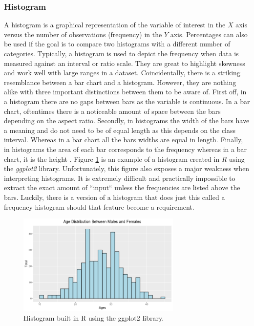 \subsubsection{Histogram}
A histogram is a graphical representation of the variable of interest in the 
$X$ axis versus the number of observations (frequency) in the $Y$ axis. Percentages 
can also be used if the goal is to compare two histograms with a different number of 
categories. Typically, a histogram is used to depict the frequency when data is 
measured against an interval or ratio scale. They are great to highlight skewness
and work well with large ranges in a dataset. Coincidentally, there is a striking
resemblance between a bar chart and a histogram. However, they are nothing alike 
with three important distinctions between them to be aware of. First off, in a histogram there 
are no gaps between bars as the variable is continuous. In a bar chart, oftentimes 
there is a noticeable amount of space between the bars depending on the aspect
ratio. Secondly, in histograms the width of the bars have a meaning and do not 
need to be of equal length as this depends on the class interval. Whereas in a bar 
chart all the bars widths are equal in length. Finally, in histograms the area 
of each bar corresponds to the frequency whereas in a bar chart, it is the height \cite{c10}. 
Figure \ref{figure:histogram} is an example of a histogram created in \textit{R} 
using the \textit{ggplot2} library. Unfortunately, this figure also exposes a major 
weakness when interpreting histograms. It is extremely difficult and practically 
impossible to extract the exact amount of ``input`` unless the frequencies are listed 
above the bars. Luckily, there is a version of a histogram that does just this 
called a frequency histogram should that feature become a requirement. 

\begin{figure}[!ht]
    \centering
        \includegraphics[height=5cm]{figures/histogram.png}
    \caption{Histogram built in R using the ggplot2 library.}
    \label{figure:histogram}
\end{figure} 

